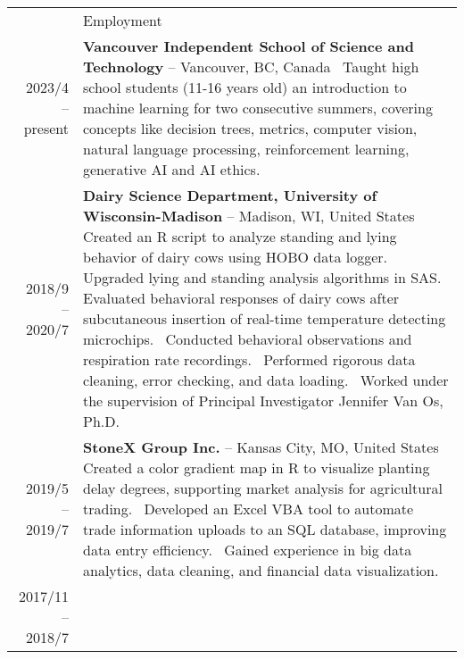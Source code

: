 \documentclass[letterpaper, 11pt]{article}
\newcommand{\headingfont}{\Large\color{OliveGreen}}
\newenvironment{SectionTable}[1]{
	\renewcommand*{\arraystretch}{1.7}
	\setlength{\tabcolsep}{10pt}
	\begin{longtable}{Rp{5.2in}} & #1 \\}
{\end{longtable}\vspace{-.3cm}}
\begin{document}
\begin{SectionTable}{\headingfont Employment}
2023/4 -- present &
 \textbf{Vancouver Independent School of Science and Technology}  \newline
{} -- Vancouver, BC, Canada \newline
\textbullet\, Taught high school students (11-16 years old) an introduction to machine learning for two consecutive summers, covering concepts like decision trees, metrics, computer vision, natural language processing, reinforcement learning, generative AI and AI ethics. \\
2018/9 -- 2020/7 &
\textbf{Dairy Science Department, University of Wisconsin-Madison} \newline
{} -- Madison, WI, United States \newline
\textbullet\, Created an R script to analyze standing and lying behavior of dairy cows using HOBO data logger. Upgraded lying and standing analysis algorithms in SAS. \newline
\textbullet\, Evaluated behavioral responses of dairy cows after subcutaneous insertion of real-time temperature detecting microchips.  \newline
\textbullet\, Conducted behavioral observations and respiration rate recordings. \newline
\textbullet\, Performed rigorous data cleaning, error checking, and data loading. \newline
\textbullet\, Worked under the supervision of Principal Investigator Jennifer Van Os, Ph.D. \\
2019/5 -- 2019/7 &
\textbf{StoneX Group Inc.} \newline
{} -- Kansas City, MO, United States \newline
\textbullet\, Created a color gradient map in R to visualize planting delay degrees, supporting market analysis for agricultural trading. \newline
\textbullet\, Developed an Excel VBA tool to automate trade information uploads to an SQL database, improving data entry efficiency. \newline
\textbullet\, Gained experience in big data analytics, data cleaning, and financial data visualization.\\
2017/11 -- 2018/7 &

\end{SectionTable}
\end{document}
